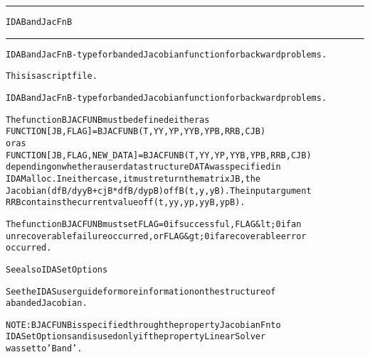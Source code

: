 \begin{samepage}
\hrule
\begin{center}
{\large \verb!IDABandJacFnB!}
\label{p:IDABandJacFnB}
\end{center}
\hrule\vspace{0.1in}



\begin{alltt}
IDABandJacFnB - type for banded Jacobian function for backward problems.
\end{alltt}

\end{samepage}



\begin{samepage}


\begin{alltt}
This is a script file. 
\end{alltt}

\end{samepage}



\begin{alltt}
IDABandJacFnB - type for banded Jacobian function for backward problems.

   The function BJACFUNB must be defined either as
        FUNCTION [JB, FLAG] = BJACFUNB(T, YY, YP, YYB, YPB, RRB, CJB)
   or as
        FUNCTION [JB,FLAG,NEW_DATA] = BJACFUNB(T,YY,YP,YYB,YPB,RRB,CJB)
   depending on whether a user data structure DATA was specified in
   IDAMalloc. In either case, it must return the matrix JB, the
   Jacobian (dfB/dyyB + cjB*dfB/dypB)of fB(t,y,yB). The input argument
   RRB contains the current value of f(t,yy,yp,yyB,ypB).

   The function BJACFUNB must set FLAG=0 if successful, FLAG&lt;0 if an
   unrecoverable failure occurred, or FLAG&gt;0 if a recoverable error
   occurred.

   See also IDASetOptions

   See the IDAS user guide for more information on the structure of
   a banded Jacobian.

   NOTE: BJACFUNB is specified through the property JacobianFn to
   IDASetOptions and is used only if the property LinearSolver
   was set to 'Band'.
\end{alltt}






\vspace{0.1in}